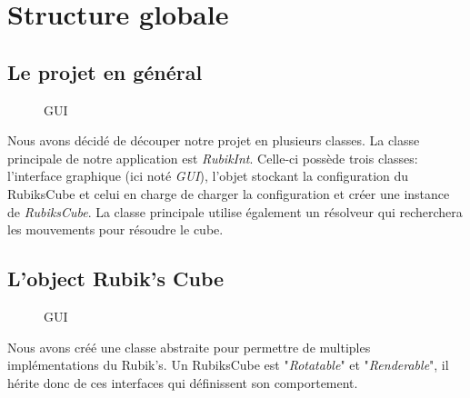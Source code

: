 \chapter{Structure globale}


\section{Le projet en général}

\begin{figure}[h]
\begin{center}
\end{center}
\caption{GUI}
\end{figure}

Nous avons décidé de découper notre projet en plusieurs classes.
La classe principale de notre application est \textit{RubikInt}.
Celle-ci possède trois classes: l'interface graphique (ici noté \textit{GUI}), l'objet stockant la configuration du RubiksCube et celui en charge de charger la configuration et créer une instance de \textit{RubiksCube}.
La classe principale utilise également un résolveur qui recherchera les mouvements pour résoudre le cube.

\section{L'object Rubik's Cube}

\begin{figure}[h]
\begin{center}
\end{center}
\caption{GUI}
\end{figure}

Nous avons créé une classe abstraite pour permettre de multiples implémentations du Rubik's.
Un RubiksCube est "\textit{Rotatable}" et "\textit{Renderable}", il hérite donc de ces interfaces qui définissent son comportement.

